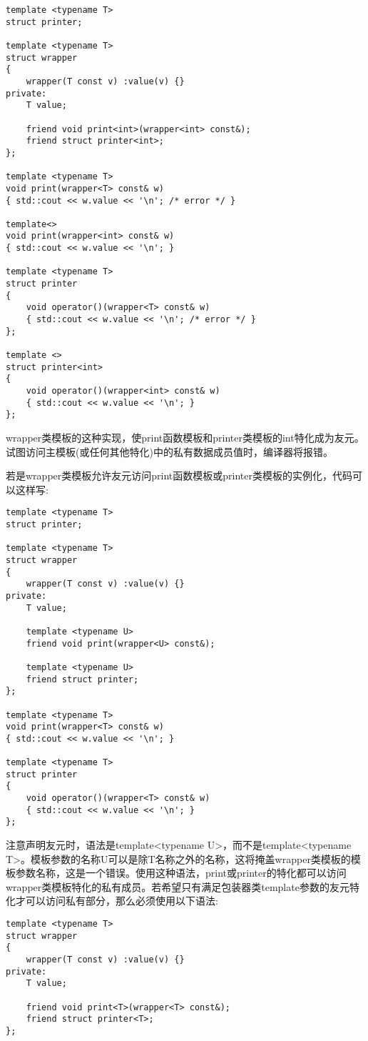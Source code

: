 \begin{lstlisting}[style=styleCXX]
template <typename T>
struct printer;

template <typename T>
struct wrapper
{
	wrapper(T const v) :value(v) {}
private:
	T value;
	
	friend void print<int>(wrapper<int> const&);
	friend struct printer<int>;
};

template <typename T>
void print(wrapper<T> const& w)
{ std::cout << w.value << '\n'; /* error */ }

template<>
void print(wrapper<int> const& w)
{ std::cout << w.value << '\n'; }

template <typename T>
struct printer
{
	void operator()(wrapper<T> const& w)
	{ std::cout << w.value << '\n'; /* error */ }
};

template <>
struct printer<int>
{
	void operator()(wrapper<int> const& w)
	{ std::cout << w.value << '\n'; }
};
\end{lstlisting}

wrapper类模板的这种实现，使print函数模板和printer类模板的int特化成为友元。试图访问主模板(或任何其他特化)中的私有数据成员值时，编译器将报错。

若是wrapper类模板允许友元访问print函数模板或printer类模板的实例化，代码可以这样写:

\begin{lstlisting}[style=styleCXX]
template <typename T>
struct printer;

template <typename T>
struct wrapper
{
	wrapper(T const v) :value(v) {}
private:
	T value;
	
	template <typename U>
	friend void print(wrapper<U> const&);
	
	template <typename U>
	friend struct printer;
};

template <typename T>
void print(wrapper<T> const& w)
{ std::cout << w.value << '\n'; }

template <typename T>
struct printer
{
	void operator()(wrapper<T> const& w)
	{ std::cout << w.value << '\n'; }
};
\end{lstlisting}

注意声明友元时，语法是template<typename U>，而不是template<typename T>。模板参数的名称U可以是除T名称之外的名称，这将掩盖wrapper类模板的模板参数名称，这是一个错误。使用这种语法，print或printer的特化都可以访问wrapper类模板特化的私有成员。若希望只有满足包装器类template参数的友元特化才可以访问私有部分，那么必须使用以下语法:

\begin{lstlisting}[style=styleCXX]
template <typename T>
struct wrapper
{
	wrapper(T const v) :value(v) {}
private:
	T value;
	
	friend void print<T>(wrapper<T> const&);
	friend struct printer<T>;
};
\end{lstlisting}

